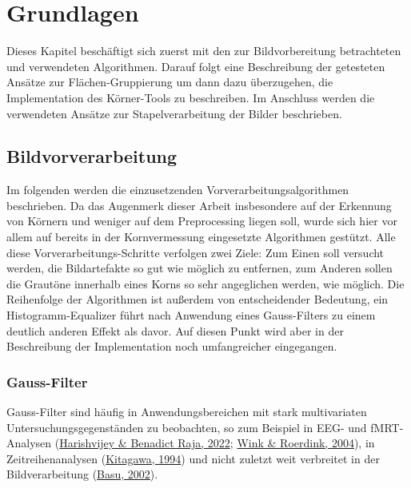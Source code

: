 \documentclass[
  12pt,
]{book}
\begin{document}
\hypertarget{grundlagen}{%
\chapter{Grundlagen}\label{grundlagen}}

Dieses Kapitel beschäftigt sich zuerst mit den zur Bildvorbereitung betrachteten und verwendeten Algorithmen. Darauf folgt eine Beschreibung der getesteten Ansätze zur Flächen-Gruppierung um dann dazu überzugehen, die Implementation des Körner-Tools zu beschreiben.
Im Anschluss werden die verwendeten Ansätze zur Stapelverarbeitung der Bilder beschrieben.

\hypertarget{bildvorverarbeitung}{%
\section{Bildvorverarbeitung}\label{bildvorverarbeitung}}

Im folgenden werden die einzusetzenden Vorverarbeitungsalgorithmen beschrieben. Da das Augenmerk dieser Arbeit insbesondere auf der Erkennung von Körnern und weniger auf dem Preprocessing liegen soll, wurde sich hier vor allem auf bereits in der Kornvermessung eingesetzte Algorithmen gestützt.
Alle diese Vorverarbeitungs-Schritte verfolgen zwei Ziele:
Zum Einen soll versucht werden, die Bildartefakte so gut wie möglich zu entfernen, zum Anderen sollen die Grautöne innerhalb eines Korns so sehr angeglichen werden, wie möglich.
Die Reihenfolge der Algorithmen ist außerdem von entscheidender Bedeutung, ein Histogramm-Equalizer führt nach Anwendung eines Gauss-Filters zu einem deutlich anderen Effekt als davor. Auf diesen Punkt wird aber in der Beschreibung der Implementation noch umfangreicher eingegangen.

\hypertarget{gauss-filter}{%
\subsection{Gauss-Filter}\label{gauss-filter}}

Gauss-Filter sind häufig in Anwendungsbereichen mit stark multivariaten Untersuchungsgegenständen zu beobachten, so zum Beispiel in EEG- und fMRT-Analysen (\protect\hyperlink{ref-harishvijeyAutomatedTechniqueEEG2022}{Harishvijey \& Benadict Raja, 2022}; \protect\hyperlink{ref-winkDenoisingFunctionalMR2004}{Wink \& Roerdink, 2004}), in Zeitreihenanalysen (\protect\hyperlink{ref-kitagawaTwofilterFormulaSmoothing1994}{Kitagawa, 1994}) und nicht zuletzt weit verbreitet in der Bildverarbeitung (\protect\hyperlink{ref-basuGaussianbasedEdgedetectionMethodsa2002}{Basu, 2002}).
\end{document}
